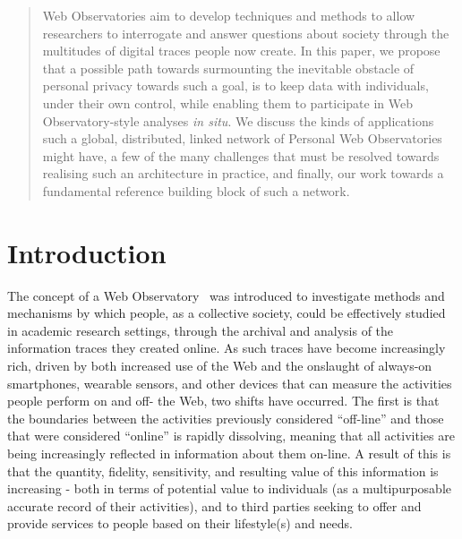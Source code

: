 \documentclass{sig-alternate}
\begin{document}


\maketitle
\begin{abstract}
Web Observatories aim to develop techniques and methods to allow researchers to interrogate and answer questions about society through the multitudes of digital traces people now create.  In this paper, we propose that a possible path towards surmounting the inevitable obstacle of personal privacy towards such a goal, is to keep data with individuals, under their own control, while enabling them to participate in Web Observatory-style analyses \emph{in situ}.  We discuss the kinds of applications such a global, distributed, linked network of Personal Web Observatories might have, a few of the many challenges that must be resolved towards realising such an architecture in practice, and finally, our work towards a fundamental reference building block of such a network.
\end{abstract}



\section{Introduction}

The concept of a Web Observatory~\cite{Tiropanis2013,Hall2014} was introduced to investigate methods and mechanisms by which people, as a collective society, could be effectively studied in academic research settings, through the archival and analysis of the information traces they created online. As such traces have become increasingly rich, driven by both increased use of the Web and the onslaught of always-on smartphones, wearable sensors, and other devices that can measure the activities people perform on and off- the Web, two shifts have occurred. The first is that the boundaries between the activities previously considered ``off-line'' and those that were considered ``online'' is rapidly dissolving, meaning that all activities are being increasingly reflected in information about them on-line. A result of this is that the quantity, fidelity, sensitivity, and resulting value of this information is increasing - both in terms of potential value to individuals (as a multipurposable accurate record of their activities), and to third parties seeking to offer and provide services to people based on their lifestyle(s) and needs. 
\end{document}
